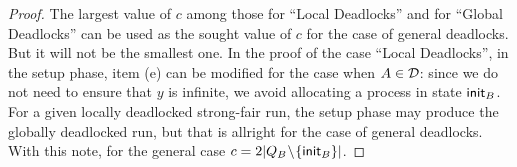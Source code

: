 \begin{proof}
The largest value of $c$ among those for ``Local Deadlocks'' 
and for ``Global Deadlocks'' can be used as the sought value of $c$ 
for the case of general deadlocks.
But it will not be the smallest one.
In the proof of the case ``Local Deadlocks'', in the setup phase, 
item (e) can be modified for the case when $A \in \mathcal{D}$:
since we do not need to ensure that $y$ is infinite, 
we avoid allocating a process in state ${\sf init}_B$.
For a given locally deadlocked strong-fair run, the setup phase may produce
the globally deadlocked run, but that is allright for the case of general deadlocks.
With this note, for the general case $c = 2|Q_B \!\setminus\! \{{\sf init}_B\}|$.
%
%
%  
%
%

\end{proof}
